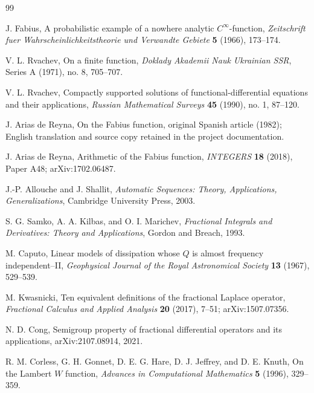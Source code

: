 \documentclass[11pt]{article}
\theoremstyle{definition}
\theoremstyle{remark}
\begin{document}
\begin{thebibliography}{99}

J. Fabius,
\newblock A probabilistic example of a nowhere analytic $C^\infty$-function,
\newblock \emph{Zeitschrift fuer Wahrscheinlichkeitstheorie und Verwandte Gebiete}
\textbf{5} (1966), 173--174.

V. L. Rvachev,
\newblock On a finite function,
\newblock \emph{Doklady Akademii Nauk Ukrainian SSR}, Series A (1971), no. 8, 705--707.

V. L. Rvachev,
\newblock Compactly supported solutions of functional-differential equations and their
applications,
\newblock \emph{Russian Mathematical Surveys} \textbf{45} (1990), no. 1, 87--120.

J. Arias de Reyna,
\newblock On the Fabius function,
\newblock original Spanish article (1982); English translation and source copy retained in the
project documentation.

J. Arias de Reyna,
\newblock Arithmetic of the Fabius function,
\newblock \emph{INTEGERS} \textbf{18} (2018), Paper A48; arXiv:1702.06487.

J.-P. Allouche and J. Shallit,
\newblock \emph{Automatic Sequences: Theory, Applications, Generalizations},
\newblock Cambridge University Press, 2003.

S. G. Samko, A. A. Kilbas, and O. I. Marichev,
\newblock \emph{Fractional Integrals and Derivatives: Theory and Applications},
\newblock Gordon and Breach, 1993.

M. Caputo,
\newblock Linear models of dissipation whose $Q$ is almost frequency independent--II,
\newblock \emph{Geophysical Journal of the Royal Astronomical Society} \textbf{13} (1967),
529--539.

M. Kwasnicki,
\newblock Ten equivalent definitions of the fractional Laplace operator,
\newblock \emph{Fractional Calculus and Applied Analysis} \textbf{20} (2017), 7--51;
arXiv:1507.07356.

N. D. Cong,
\newblock Semigroup property of fractional differential operators and its applications,
\newblock arXiv:2107.08914, 2021.

R. M. Corless, G. H. Gonnet, D. E. G. Hare, D. J. Jeffrey, and D. E. Knuth,
\newblock On the Lambert $W$ function,
\newblock \emph{Advances in Computational Mathematics} \textbf{5} (1996), 329--359.


\end{thebibliography}
\end{document}
